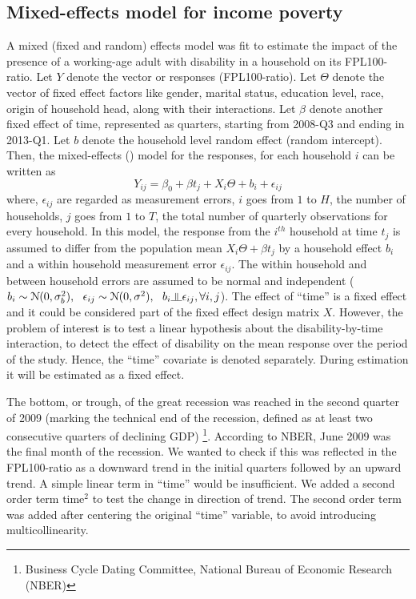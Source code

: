 \documentclass[11pt]{extarticle} %
\begin{document}
\subsection{Mixed-effects model for income poverty}
A mixed (fixed and random) effects model was fit to estimate the impact of the presence of a working-age adult with disability in a household on its FPL100-ratio. Let $Y$ denote the vector or responses (FPL100-ratio). Let $\Theta$ denote the vector of fixed effect factors like gender, marital status, education level, race, origin of household head, along with their interactions. Let $\beta$ denote another fixed effect of time, represented as quarters, starting from 2008-Q3 and ending in 2013-Q1. Let $b$ denote the household level random effect (random intercept). Then, the mixed-effects (\cite{Fitzmaurice_2012_Applied}) model for the responses, for each household $i$ can be written as
\vspace{-0.5cm}
\begin{equation}
Y_{ij} = \beta_0 + \beta t_j + X_i\Theta + b_i + \epsilon_{ij}
\label{eq:MixedEffects1}
\end{equation}
where, $\epsilon_{ij}$ are regarded as measurement errors, $i$ goes from $1$ to $H$, the number of households, $j$ goes from $1$ to $T$, the total number of quarterly observations for every household. In this model, the response from the $i^{th}$ household at time $t_j$ is assumed to differ from the population mean $X_i\Theta + \beta t_j$ by a household effect $b_i$ and a within household measurement error $\epsilon_{ij}$. The within household and between household errors are assumed to be normal and independent ($b_i \sim \N(0, \sigma^2_b),\ \ \epsilon_{ij} \sim \N(0, \sigma^2), \ \ b_i \indep \epsilon_{ij}, \forall i, j$). The effect of ``time'' is a fixed effect and it could be considered part of the fixed effect design matrix $X$. However, the problem of interest is to test a linear hypothesis about the disability-by-time interaction, to detect the effect of disability on the mean response over the period of the study. Hence, the ``time'' covariate is denoted separately. During estimation it will be estimated as a fixed effect. 

The bottom, or trough, of the great recession was reached in the second quarter of 2009 (marking the technical end of the recession, defined as at least two consecutive quarters of declining GDP) \footnote{Business Cycle Dating Committee, National Bureau of Economic Research (NBER)}. According to NBER, June 2009 was the final month of the recession. We wanted to check if this was reflected in the FPL100-ratio as a downward trend in the initial quarters followed by an upward trend. A simple linear term in ``time'' would be insufficient. We added a second order term $\text{time}^2$ to test the change in direction of trend. The second order term was added after centering the original ``time'' variable, to avoid introducing multicollinearity. 
\end{document}
